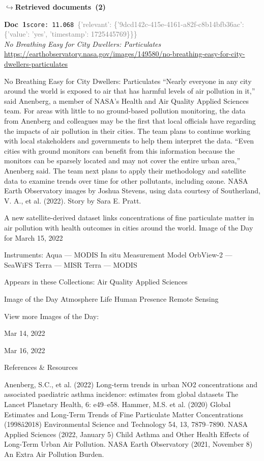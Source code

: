 \documentclass[a4paper,11pt]{article}
\begin{document}
\noindent\hfill{\footnotesize\textcolor{doccolor}{\textbf{$\hookrightarrow$\enspace Retrieved documents~(2)}}}
\begin{docenv}
{\footnotesize\textcolor{doccolor}{\textbf{Doc~1}}}\hfill{\tiny\texttt{score:~11.068}}\ {\tiny\textcolor{gray}{\{'relevant': \{'9dcd142c-415e-4161-a82f-c8b14bfb36ac': \{'value': 'yes', 'timestamp': 1725445769\}\}\}}}\\[3pt]
{\small\textit{No Breathing Easy for City Dwellers: Particulates}}\\[2pt]
{\tiny\url{https://earthobservatory.nasa.gov/images/149580/no-breathing-easy-for-city-dwellers-particulates}}\\[4pt]
{\footnotesize No Breathing Easy for City Dwellers: Particulates
“Nearly everyone in any city around the world is exposed to air that has harmful levels of air pollution in it,” said Anenberg, a member of NASA’s Health and Air Quality Applied Sciences team.
For areas with little to no ground-based pollution monitoring, the data from Anenberg and colleagues may be the first that local officials have regarding the impacts of air pollution in their cities. The team plans to continue working with local stakeholders and governments to help them interpret the data.
“Even cities with ground monitors can benefit from this information because the monitors can be sparsely located and may not cover the entire urban area,” Anenberg said. The team next plans to apply their methodology and satellite data to examine trends over time for other pollutants, including ozone.
NASA Earth Observatory images by Joshua Stevens, using data courtesy of Southerland, V. A., et al. (2022). Story by Sara E. Pratt.

A new satellite-derived dataset links concentrations of fine particulate matter in air pollution with health outcomes in cities around the world.
Image of the Day for March 15, 2022

Instruments:
Aqua — MODIS
In situ Measurement
Model
OrbView-2 — SeaWiFS
Terra — MISR
Terra — MODIS

Appears in these Collections:
Air Quality
Applied Sciences

Image of the Day
Atmosphere
Life
Human Presence
Remote Sensing

View more Images of the Day:

Mar 14, 2022

Mar 16, 2022

References \& Resources

Anenberg, S.C., et al. (2022) Long-term trends in urban NO2 concentrations and associated paediatric asthma incidence: estimates from global datasets The Lancet Planetary Health, 6: e49–e58.
Hammer, M.S. et al. (2020) Global Estimates and Long-Term Trends of Fine Particulate Matter Concentrations (1998â2018) Environmental Science and Technology 54, 13, 7879–7890.
NASA Applied Sciences (2022, January 5) Child Asthma and Other Health Effects of Long-Term Urban Air Pollution. 
NASA Earth Observatory (2021, November 8) An Extra Air Pollution Burden.}
\end{docenv}
\end{document}
